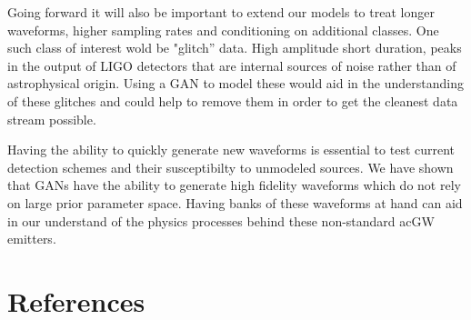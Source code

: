 \documentclass[12pt]{iopart}
\begin{document}
Going forward it will also be important to extend our models to treat longer waveforms, higher sampling rates and conditioning on additional classes. One such class of interest wold be "glitch'' data. High amplitude short duration, peaks in the output of LIGO detectors that are internal sources of noise rather than of astrophysical origin. Using a GAN to model these would aid in the understanding of these glitches and could help to remove them in order to get the cleanest data stream possible. 

Having the ability to quickly
generate new waveforms is essential to test current detection schemes and their
susceptibilty to unmodeled sources. We have shown that \acp{GAN} have the ability
to generate high fidelity waveforms which do not rely on large prior parameter space. Having banks of these
waveforms at hand can aid in our understand of the physics processes behind
these non-standard ac{GW} emitters.  

\section*{References}


\clearpage

\appendix
\end{document}
